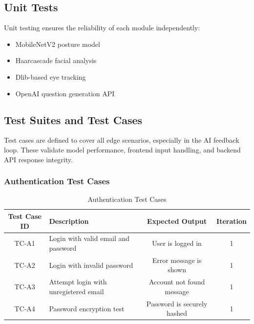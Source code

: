 \subsection{Unit Tests}
Unit testing ensures the reliability of each module independently:
\begin{itemize}
    \item MobileNetV2 posture model
    \item Haarcascade facial analysis
    \item Dlib-based eye tracking
    \item OpenAI question generation API
\end{itemize}

\subsection{Test Suites and Test Cases}
Test cases are defined to cover all edge scenarios, especially in the AI feedback loop. These validate model performance, frontend input handling, and backend API response integrity.

\subsubsection{Authentication Test Cases}
\begin{table}[!htbp]
    \centering
    \begin{tabular}{|c|p{6cm}|c|c|}
        \hline
        \textbf{Test Case ID} & \textbf{Description} & \textbf{Expected Output} & \textbf{Iteration} \\
        \hline
        TC-A1 & Login with valid email and password & User is logged in & 1 \\
        \hline
        TC-A2 & Login with invalid password & Error message is shown & 1 \\
        \hline
        TC-A3 & Attempt login with unregistered email & Account not found message & 1 \\
        \hline
        TC-A4 & Password encryption test & Password is securely hashed & 1 \\
        \hline
    \end{tabular}
    \caption{Authentication Test Cases}
    \label{tab:auth-test-cases}
\end{table}



